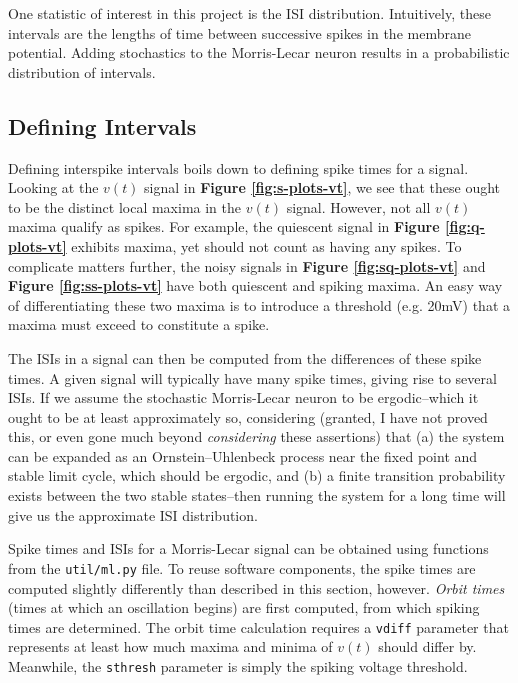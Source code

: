 \documentclass[letterpaper,12pt]{article}
\numberwithin{table}{section}
\numberwithin{figure}{section}
\numberwithin{equation}{section}
\newcommand{\reffig}[1]{\textbf{Figure \ref{#1}}}
\begin{document}
\begin{flushleft}
    One statistic of interest in this project is the ISI distribution. Intuitively, these intervals are the lengths of time between successive spikes in the membrane potential. Adding stochastics to the Morris-Lecar neuron results in a probabilistic distribution of intervals.

    \subsection{Defining Intervals}

    Defining interspike intervals boils down to defining spike times for a signal. Looking at the $v(t)$ signal in \reffig{fig:s-plots-vt}, we see that these ought to be the distinct local maxima in the $v(t)$ signal. However, not all $v(t)$ maxima qualify as spikes. For example, the quiescent signal in \reffig{fig:q-plots-vt} exhibits maxima, yet should not count as having any spikes. To complicate matters further, the noisy signals in \reffig{fig:sq-plots-vt} and \reffig{fig:ss-plots-vt} have both quiescent and spiking maxima. An easy way of differentiating these two maxima is to introduce a threshold (e.g. 20mV) that a maxima must exceed to constitute a spike.

    The ISIs in a signal can then be computed from the differences of these spike times. A given signal will typically have many spike times, giving rise to several ISIs. If we assume the stochastic Morris-Lecar neuron to be ergodic--which it ought to be at least approximately so, considering (granted, I have not proved this, or even gone much beyond \textit{considering} these assertions) that (a) the system can be expanded as an Ornstein–Uhlenbeck process near the fixed point and stable limit cycle, which should be ergodic, and (b) a finite transition probability exists between the two stable states--then running the system for a long time will give us the approximate ISI distribution.

    Spike times and ISIs for a Morris-Lecar signal can be obtained using functions from the \texttt{util/ml.py} file. To reuse software components, the spike times are computed slightly differently than described in this section, however. \textit{Orbit times} (times at which an oscillation begins) are first computed, from which spiking times are determined. The orbit time calculation requires a \texttt{vdiff} parameter that represents at least how much maxima and minima of $v(t)$ should differ by. Meanwhile, the \texttt{sthresh} parameter is simply the spiking voltage threshold.


\end{flushleft}
\end{document}

